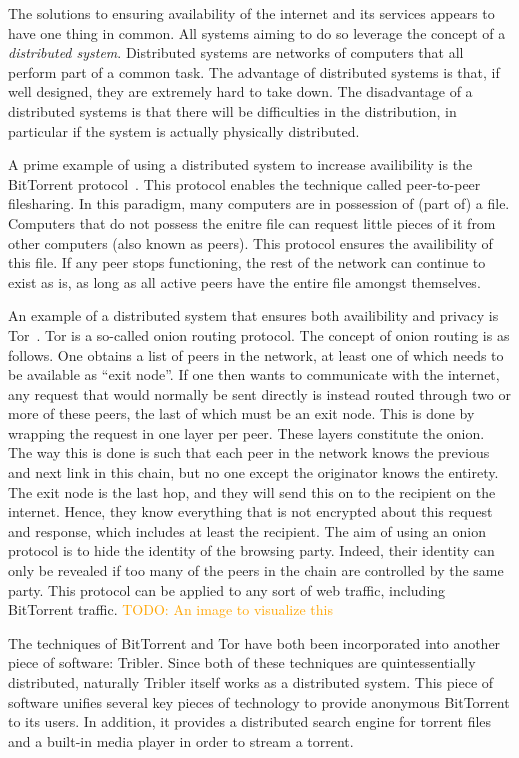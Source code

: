 \documentclass[a4paper,11pt]{book}
\newcommand\nicetohave[1]{\textcolor{orange}{TODO: #1}}
\theoremstyle{definition}
\begin{document}
The solutions to ensuring availability of the internet and its services
appears to have one thing in common. All systems aiming to do so leverage the concept of
a \emph{distributed system}. Distributed systems are networks of computers that all perform part
of a common task. The advantage of distributed systems is that, if well designed, they are
extremely hard to take down. The disadvantage of a distributed systems is that there will
be difficulties in the distribution, in particular if the system is actually physically
distributed. 

A prime example of using a distributed system to increase availibility is the 
BitTorrent protocol~\cite{cohen2008BitTorrent}. This protocol enables the technique
called peer-to-peer filesharing.
In this paradigm, many computers are in possession of (part of) a file. Computers
that do not possess the enitre file can request little pieces of it from other
computers (also known as peers). This protocol ensures the availibility of this
file. If any peer stops functioning, the rest of
the network can continue to exist as is, as long as all active peers have the
entire file amongst themselves. 

An example of a distributed system that ensures both availibility and privacy is
Tor~\cite{dingledine2004tor}. Tor is a so-called onion routing protocol. 
The concept of onion routing is as follows. One obtains a list of peers in the
network, at least one of which needs to be available as ``exit node''. If one
then wants to communicate with the internet, any request that would normally
be sent directly is instead routed through two or more of these peers, the last
of which must be an exit node. This is done by wrapping the request in one
layer per peer. These layers constitute the onion. The way this is done is such
that each peer in the network knows the previous and next link in this chain,
but no one except the originator knows the entirety. The exit node is the last
hop, and they will send this on to the recipient on the internet. Hence, they
know everything that is not encrypted about this request and response, which includes at
least the recipient. 
The aim of using an onion protocol is to hide the identity of the browsing party. Indeed,
their identity can only be revealed if too many of the peers in the chain are controlled
by the same party. This protocol can be applied to any sort of web traffic, including
BitTorrent traffic. 
\nicetohave{An image to visualize this}

The techniques of BitTorrent and Tor have both been incorporated into another piece
of software: Tribler. Since both of these techniques are quintessentially distributed,
naturally Tribler itself works as a distributed system. This piece of software unifies
several key pieces of technology to provide anonymous BitTorrent to its users. In addition,
it provides a distributed search engine for torrent files and a built-in media player in
order to stream a torrent. 
\end{document}
